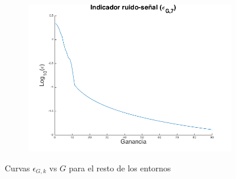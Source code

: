\documentclass[letterpaper,11pt]{article}
\begin{document}
\begin{figure}[H]
\begin{subfigure}[b]{0.3\textwidth}
        \includegraphics[width=\textwidth]{img/parte_c/curva7.png}
    \end{subfigure}
    
    \caption{Curvas $\epsilon_{G,k}$ vs $G$ para el resto de los entornos}
    \label{partec2}
\end{figure}
\end{document}
